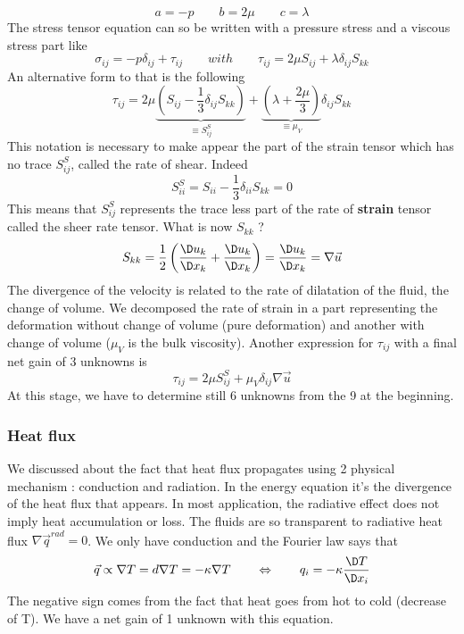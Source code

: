 		\begin{equation}
			a = -p \qquad b = 2\mu \qquad c = \lambda
		\end{equation}
		The stress tensor equation can so be written with a pressure stress and a viscous stress part like 
		\begin{equation}
			\sigma _{ij} = -p\delta _{ij} + \tau _{ij} \qquad with \qquad \tau _{ij} = 2\mu S_{ij} + \lambda \delta _{ij} S_{kk}
			\label{eq:1.58}
		\end{equation}
	  	An alternative form to that is the following 
	  	\begin{equation}
	  		\tau _{ij} = 2 \mu \underbrace{\left( S_{ij} - \frac{1}{3} \delta _{ij} S_{kk} \right)}_{\equiv S_{ij}^S} +\underbrace{\left( \lambda + \frac{2\mu}{3} \right)}_{\equiv \mu _V} \delta _{ij} S_{kk}
	  	\end{equation}
	  	This notation is necessary to make appear the part of the strain tensor which has no trace $S_{ij}^S$, called the rate of shear. Indeed 
	  	\begin{equation}
	  		S_{ii}^S = S_{ii} - \frac{1}{3}\delta _{ii}S_{kk} = 0
	  	\end{equation}
	  	This means that $S_{ij}^S$ represents the trace less part of the rate of \textbf{strain} tensor called the sheer rate tensor. What is now $S_{kk}$ ? 
	  	\begin{equation}
	  		S_{kk} = \frac{1}{2} \left( \frac{\D u_k}{\D x_k} + \frac{\D u_k}{\D x_k} \right) = \frac{\D u_k}{\D x_k} = \nabla \vec{u}
	  	\end{equation}
	  	The divergence of the velocity is related to the rate of dilatation of the fluid, the change of volume. We decomposed the rate of strain in a part representing the deformation without change of volume (pure deformation) and another with change of volume ($\mu _V$ is the bulk viscosity). Another expression for $\tau _{ij}$ with a final net gain of 3 unknowns is 
	  	\begin{equation}
	  		\tau _{ij} = 2 \mu S_{ij}^S + \mu _V \delta _{ij} \nabla \vec{u}
	  		\label{eq:1.62}
		\end{equation}	  	 
		At this stage, we have to determine still 6 unknowns from the 9 at the beginning. 
		
	\subsubsection{Heat flux}
		We discussed about the fact that heat flux propagates using 2 physical mechanism : conduction and radiation. In the energy equation it's the divergence of the heat flux that appears. In most application, the radiative effect does not imply heat accumulation or loss. The fluids are so transparent to radiative heat flux $\nabla \vec{q}^{rad} =0$. We only have conduction and the Fourier law says that 
		\begin{equation}
			\vec{q} \propto \nabla T = d\nabla T = -\kappa \nabla T \qquad \Leftrightarrow \qquad q_i = -\kappa \frac{\D T}{\D x_i}
		\end{equation}
	The negative sign comes from the fact that heat goes from hot to cold (decrease of T). We have a net gain of 1 unknown with this equation. 
	
